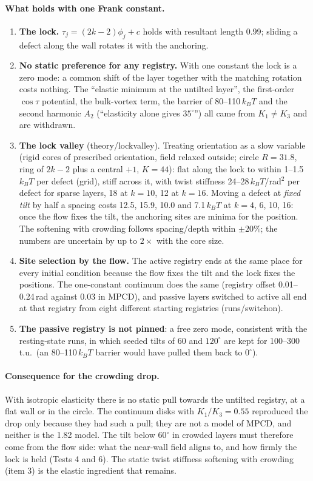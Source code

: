 \documentclass[11pt,a4paper]{article}
\newcommand{\kT}{k_BT}
\begin{document}
\paragraph{What holds with one Frank constant.}
\begin{enumerate}
\item \textbf{The lock.} $\tau_j=(2k-2)\phi_j+c$ holds with resultant length 0.99; sliding a defect along the wall rotates it with the anchoring.
\item \textbf{No static preference for any registry.} With one constant the lock is a zero mode: a common shift of the layer together with the
matching rotation costs nothing. The ``elastic minimum at the untilted layer'', the first-order $\cos\tau$ potential, the bulk-vortex term, the barrier of
80--110\,$\kT$ and the second harmonic $A_2$ (``elasticity alone gives $35^\circ$'') all came from $K_1\neq K_3$ and are withdrawn.
\item \textbf{The lock valley} (theory/lockvalley). Treating orientation as a slow variable (rigid cores of prescribed orientation, field relaxed outside;
circle $R=31.8$, ring of $2k-2$ plus a central $+1$, $K=44$): flat along the lock to within 1--1.5\,$\kT$ per defect (grid), stiff across it, with twist
stiffness 24--28\,$\kT$/rad$^2$ per defect for sparse layers, 18 at $k=10$, 12 at $k=16$. Moving a defect at \emph{fixed tilt} by half a spacing costs
12.5, 15.9, 10.0 and 7.1\,$\kT$ at $k=4$, 6, 10, 16: once the flow fixes the tilt, the anchoring sites are minima for the position. The softening with
crowding follows spacing/depth within $\pm20\%$; the numbers are uncertain by up to $2\times$ with the core size.
\item \textbf{Site selection by the flow.} The active registry ends at the same place for every initial condition because the flow fixes the tilt and
the lock fixes the positions. The one-constant continuum does the same (registry offset 0.01--0.24\,rad against 0.03 in MPCD), and passive layers switched
to active all end at that registry from eight different starting registries (runs/switchon).
\item \textbf{The passive registry is not pinned}: a free zero mode, consistent with the resting-state runs, in which seeded tilts of 60 and $120^\circ$ are kept for
100--300\,t.u.\ (an 80--110\,$\kT$ barrier would have pulled them back to $0^\circ$).
\end{enumerate}

\paragraph{Consequence for the crowding drop.} With isotropic elasticity there is no static pull towards the untilted registry, at a flat wall or in the
circle. The continuum disks with $K_1/K_3=0.55$ reproduced the drop only because they had such a pull; they are not a model of MPCD, and neither is the 1.82
model. The tilt below $60^\circ$ in crowded layers must therefore come from the flow side: what the near-wall field aligns to, and how firmly the lock is
held (Tests 4 and 6). The static twist stiffness softening with crowding (item 3) is the elastic ingredient that remains.
\end{document}
